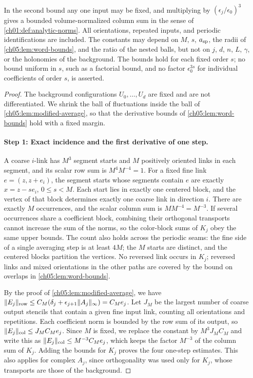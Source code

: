 \begin{lemma}
\[\begin{aligned}
 \end{aligned}
\]
In the second bound any one input may be fixed, and multiplying by $(\epsilon_j/\epsilon_0)^3$ gives a bounded volume-normalized column sum in the sense of \cref{ch01:def:analytic-norms}. All orientations, repeated inputs, and periodic identifications are included. The constants may depend on $M$, $s$, $a_{\mathrm{sp}}$, the radii of \cref{ch05:lem:word-bounds}, and the ratio of the nested balls, but not on $j$, $d$, $n$, $L$, $\gamma$, or the holonomies of the background. The bounds hold for each fixed order $s$; no bound uniform in $s$, such as a factorial bound, and no factor $\epsilon_0^{3s}$ for individual coefficients of order $s$, is asserted.
\end{lemma}

\begin{proof}
The background configurations $U_0,\ldots,U_d$ are fixed and are not differentiated. We shrink the ball of fluctuations inside the ball of \cref{ch05:lem:modified-average}, so that the derivative bounds of \cref{ch05:lem:word-bounds} hold with a fixed margin.

\paragraph{Step 1: Exact incidence and the first derivative of one step.}
A coarse $i$-link has $M^3$ segment starts and $M$ positively oriented links in each segment, and its scalar row sum is $M^4M^{-4}=1$. For a fixed fine link $e=(z,z+e_i)$, the segment starts whose segments contain $e$ are exactly $x=z-se_i$, $0\le s<M$. Each start lies in exactly one centered block, and the vertex of that block determines exactly one coarse link in direction $i$. There are exactly $M$ occurrences, and the scalar column sum is $MM^{-4}=M^{-3}$. If several occurrences share a coefficient block, combining their orthogonal transports cannot increase the sum of the norms, so the color-block sums of $K_j$ obey the same upper bounds. The count also holds across the periodic seams: the fine side of a single averaging step is at least $4M$; the $M$ starts are distinct, and the centered blocks partition the vertices. No reversed link occurs in $K_j$; reversed links and mixed orientations in the other paths are covered by the bound on overlaps in \cref{ch05:lem:word-bounds}.

By the proof of \cref{ch05:lem:modified-average}, we have $\lVert E_j\rVert_{\mathrm{row}}\le C_M(\delta_j+\epsilon_{j+1}\lVert A_j\rVert_\infty)=C_Me_j$. Let $J_M$ be the largest number of coarse output stencils that contain a given fine input link, counting all orientations and repetitions. Each coefficient norm is bounded by the row sum of its output, so $\lVert E_j\rVert_{\mathrm{col}}\le J_MC_Me_j$. Since $M$ is fixed, we replace the constant by $M^3J_MC_M$ and write this as $\lVert E_j\rVert_{\mathrm{col}}\le M^{-3}C_Me_j$, which keeps the factor $M^{-3}$ of the column sum of $K_j$. Adding the bounds for $K_j$ proves the four one-step estimates. This also applies for complex $A_j$, since orthogonality was used only for $K_j$, whose transports are those of the background.


\end{proof}
